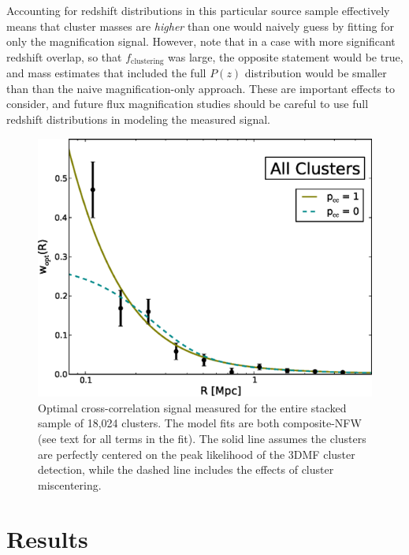 Accounting for redshift distributions in this particular source sample effectively means that cluster masses are {\it higher} than one would naively guess by fitting for only the magnification signal. However, note that in a case with more significant redshift overlap, so that $f_{\mathrm{clustering}}$ was large, the opposite statement would be true, and mass estimates that included the full $P(z)$ distribution would be smaller than than the naive magnification-only approach. These are important effects to consider, and future flux magnification studies should be careful to use full redshift distributions in modeling the measured signal.



\begin{figure}
\begin{center}
\includegraphics[scale=0.7]{plots_ch3/wopt_allClusters_U.eps}
\caption[Magnification for all Stacked 3D-MF Clusters]{Optimal cross-correlation signal measured for the entire stacked sample of 18,024 clusters. The model fits are both composite-NFW (see text for all terms in the fit). The solid line assumes the clusters are perfectly centered on the peak likelihood of the 3DMF cluster detection, while the dashed line includes the effects of cluster miscentering.}
\label{w_all}
\end{center}
\end{figure}


\section{Results}
\label{results}


